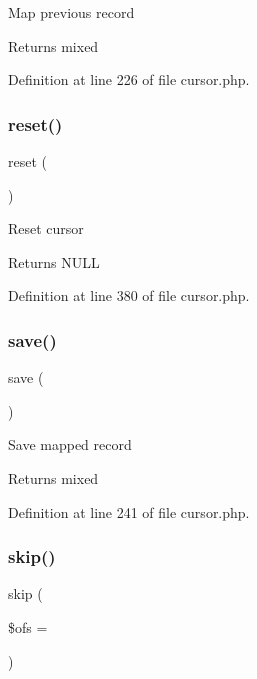 Map previous record \begin{DoxyReturn}{Returns}
mixed 
\end{DoxyReturn}


Definition at line 226 of file cursor.\+php.

\hypertarget{class_d_b_1_1_cursor_a4a20559544fdf4dcb457e258dc976cf8}{}\label{class_d_b_1_1_cursor_a4a20559544fdf4dcb457e258dc976cf8} 
\subsubsection{\texorpdfstring{reset()}{reset()}}
{\footnotesize\ttfamily reset (\begin{DoxyParamCaption}{ }\end{DoxyParamCaption})}

Reset cursor \begin{DoxyReturn}{Returns}
N\+U\+LL 
\end{DoxyReturn}


Definition at line 380 of file cursor.\+php.

\hypertarget{class_d_b_1_1_cursor_afc8a3c62679cf00ade9f15fb2a6d6132}{}\label{class_d_b_1_1_cursor_afc8a3c62679cf00ade9f15fb2a6d6132} 
\subsubsection{\texorpdfstring{save()}{save()}}
{\footnotesize\ttfamily save (\begin{DoxyParamCaption}{ }\end{DoxyParamCaption})}

Save mapped record \begin{DoxyReturn}{Returns}
mixed 
\end{DoxyReturn}


Definition at line 241 of file cursor.\+php.

\hypertarget{class_d_b_1_1_cursor_aad399d205074eaeed711d5e0157b3c0a}{}\label{class_d_b_1_1_cursor_aad399d205074eaeed711d5e0157b3c0a} 
\subsubsection{\texorpdfstring{skip()}{skip()}}
{\footnotesize\ttfamily skip (\begin{DoxyParamCaption}\item[{}]{\$ofs = {} }\end{DoxyParamCaption})}


